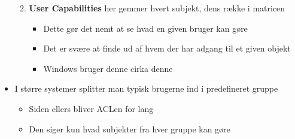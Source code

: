 \documentclass[a4, english]{article}
\begin{document}
\begin{itemize}
\begin{enumerate}
\begin{itemize}
    \end{itemize}
    \item \textbf{User Capabilities} her gemmer hvert subjekt, dens række i matricen 
    \begin{itemize}
    	\item Dette gør det nemt at se hvad en given bruger kan gøre
      \item Det er svære at finde ud af hvem der har adgang til et given objekt 
      \item Windows bruger denne cirka denne
    \end{itemize} 
  \end{enumerate}
  \item I større systemer splitter man typisk brugerne ind i predefineret gruppe
  \begin  {itemize}
  	\item Siden ellers bliver ACLen for lang
    \item Den siger kun hvad subjekter fra hver gruppe kan gøre
  \end{itemize}
\end{itemize}
\end{document}
